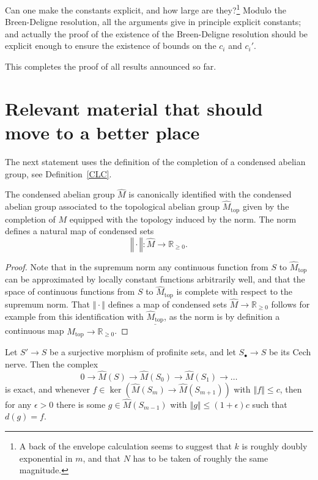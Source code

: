 \begin{question} Can one make the constants explicit, and how large are they?\footnote{A back of the envelope calculation seems to suggest that $k$ is roughly doubly exponential in $m$, and that $N$ has to be taken of roughly the same magnitude.} Modulo the Breen-Deligne resolution, all the arguments give in principle explicit constants; and actually the proof of the existence of the Breen-Deligne resolution should be explicit enough to ensure the existence of bounds on the $c_i$ and $c_i'$.
\end{question}

This completes the proof of all results announced so far.

\section{Relevant material that should move to a better place}



The next statement uses the definition of the completion of a condensed abelian group, see Definition~\ref{CLC}.

\begin{proposition}
  \label{prop:normedcompletion}
The condensed abelian group $\widehat{M}$ is canonically identified with the condensed abelian group associated to the topological abelian group $\widehat{M}_{\mathrm{top}}$ given by the completion of $M$ equipped with the topology induced by the norm. The norm defines a natural map of condensed sets
\[
‖\cdot‖: \widehat{M}\to \mathbb R_{\geq 0}.
\]
\end{proposition}

\begin{proof}
Note that in the supremum norm any continuous function from $S$ to $\widehat{M}_{\mathrm{top}}$ can be approximated by locally constant functions arbitrarily well, and that the space of continuous functions from $S$ to $\widehat{M}_{\mathrm{top}}$ is complete with respect to the supremum norm. That $‖\cdot‖$ defines a map of condensed sets $\widehat{M}\to \mathbb R_{\geq 0}$ follows for example from this identification with $\underline{\widehat{M}_{\mathrm{top}}}$, as the norm is by definition a continuous map $\widehat{M}_{\mathrm{top}}\to \mathbb R_{\geq 0}$.
\end{proof}

\begin{proposition}
  \label{cechcover-exact}
  \leanok
  Let $S' \to S$ be a surjective morphism of profinite sets,
  and let $S_\bullet\to S$ be its Cech nerve.
  Then the complex
  \[
    0\to \widehat{M}(S)\to \widehat{M}(S_0)\to \widehat{M}(S_1)\to \ldots
  \]
  is exact,
  and whenever $f\in \ker(\widehat{M}(S_m)\to \widehat{M}(S_{m+1}))$ with $‖f‖\leq c$,
  then for any $\epsilon>0$ there is some $g\in \widehat{M}(S_{m-1})$ with $‖g‖\leq (1+\epsilon)c$ such that $d(g)=f$.
\end{proposition}

